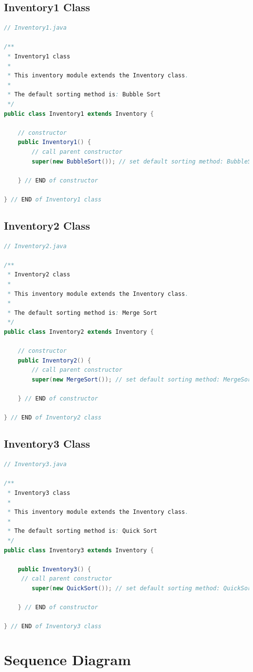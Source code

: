 \documentclass[12pt]{article}
\begin{document}
\subsection*{Inventory1 Class}
\begin{lstlisting}[language=Java]
// Inventory1.java

/**
 * Inventory1 class
 * 
 * This inventory module extends the Inventory class.
 * 
 * The default sorting method is: Bubble Sort
 */
public class Inventory1 extends Inventory {

    // constructor
    public Inventory1() {
        // call parent constructor
        super(new BubbleSort()); // set default sorting method: BubbleSort
        
    } // END of constructor

} // END of Inventory1 class

\end{lstlisting}

\subsection*{Inventory2 Class}
\begin{lstlisting}[language=Java]
// Inventory2.java

/**
 * Inventory2 class
 * 
 * This inventory module extends the Inventory class.
 * 
 * The default sorting method is: Merge Sort
 */
public class Inventory2 extends Inventory {

    // constructor
    public Inventory2() {
        // call parent constructor
        super(new MergeSort()); // set default sorting method: MergeSort
    
    } // END of constructor

} // END of Inventory2 class

\end{lstlisting}

\subsection*{Inventory3 Class}
\begin{lstlisting}[language=Java]
// Inventory3.java

/**
 * Inventory3 class
 * 
 * This inventory module extends the Inventory class.
 * 
 * The default sorting method is: Quick Sort
 */
public class Inventory3 extends Inventory {

    public Inventory3() {
     // call parent constructor
        super(new QuickSort()); // set default sorting method: QuickSort
    
    } // END of constructor

} // END of Inventory3 class

\end{lstlisting}

\newpage
\section*{Sequence Diagram}
\end{document}
